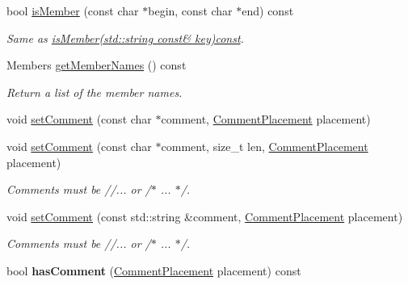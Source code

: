 \begin{DoxyCompactItemize}
bool \hyperlink{class_json_1_1_value_a2007e1e51f21f44ecf1f13e4a1c567b9}{is\+Member} (const char $\ast$begin, const char $\ast$end) const
\begin{DoxyCompactList}\small\item\em Same as \hyperlink{class_json_1_1_value_a0a098bdc6ce5ade1722584c22297adac}{is\+Member(std\+::string const\& key)const}. \end{DoxyCompactList}\item 
Members \hyperlink{class_json_1_1_value_a79d7725dce6260317333e69022367ac9}{get\+Member\+Names} () const
\begin{DoxyCompactList}\small\item\em Return a list of the member names. \end{DoxyCompactList}\item 
void \hyperlink{class_json_1_1_value_a29f3a30f7e5d3af6f38d57999bf5b480}{set\+Comment} (const char $\ast$comment, \hyperlink{namespace_json_a4fc417c23905b2ae9e2c47d197a45351}{Comment\+Placement} placement)
\item 
\mbox{\label{class_json_1_1_value_a2900152a2887b410a9ddabe278b9d492}} 
void \hyperlink{class_json_1_1_value_a2900152a2887b410a9ddabe278b9d492}{set\+Comment} (const char $\ast$comment, size\+\_\+t len, \hyperlink{namespace_json_a4fc417c23905b2ae9e2c47d197a45351}{Comment\+Placement} placement)
\begin{DoxyCompactList}\small\item\em Comments must be //... or /$\ast$ ... $\ast$/. \end{DoxyCompactList}\item 
\mbox{\label{class_json_1_1_value_a6d68a2e7d4e1e317cd9e812e12181689}} 
void \hyperlink{class_json_1_1_value_a6d68a2e7d4e1e317cd9e812e12181689}{set\+Comment} (const std\+::string \&comment, \hyperlink{namespace_json_a4fc417c23905b2ae9e2c47d197a45351}{Comment\+Placement} placement)
\begin{DoxyCompactList}\small\item\em Comments must be //... or /$\ast$ ... $\ast$/. \end{DoxyCompactList}\item 
\mbox{\label{class_json_1_1_value_a65d8e3ab6a5871cbd019a3e0f0b944a3}} 
bool {\bfseries has\+Comment} (\hyperlink{namespace_json_a4fc417c23905b2ae9e2c47d197a45351}{Comment\+Placement} placement) const

\end{DoxyCompactItemize}

